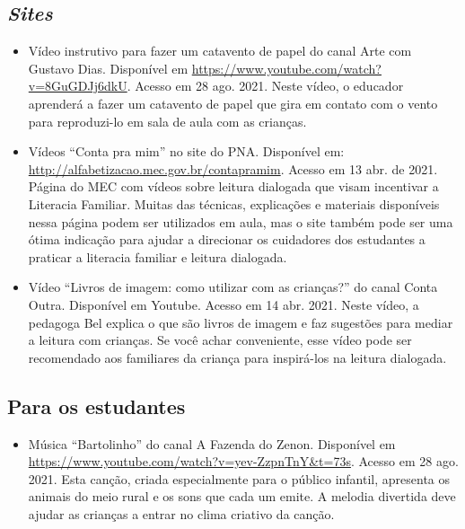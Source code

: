 \documentclass[11pt]{extarticle}
\begin{document}
\subsection{\textit{Sites}}

\begin{itemize}

\item Vídeo instrutivo para fazer um catavento de papel do canal Arte com Gustavo Dias. Disponível em \url{https://www.youtube.com/watch?v=8GuGDJj6dkU}.
	Acesso em 28 ago. 2021.
	Neste vídeo, o educador aprenderá a fazer um catavento de papel que gira em contato com o vento para
	reproduzi-lo em sala de aula com as crianças.

\item Vídeos “Conta pra mim” no site do PNA. Disponível em: \url{http://alfabetizacao.mec.gov.br/contapramim}. 
Acesso em 13 abr. de 2021.
Página do MEC com vídeos sobre leitura dialogada que visam incentivar a Literacia Familiar. Muitas das 
técnicas, explicações e materiais disponíveis nessa página podem ser utilizados em aula, mas o site também 
pode ser uma ótima indicação para ajudar a direcionar os cuidadores dos estudantes a praticar 
a literacia familiar e leitura dialogada.

\item Vídeo “Livros de imagem: como utilizar com as crianças?” do canal Conta Outra. Disponível em Youtube. 
Acesso em 14 abr. 2021. 
Neste vídeo, a pedagoga Bel explica o que são livros de imagem e faz sugestões para mediar a leitura com 
crianças. Se você achar conveniente, esse vídeo pode ser recomendado aos familiares da criança 
para inspirá-los na leitura dialogada. 

\end{itemize}


\subsection{Para os estudantes}
\begin{itemize}
\item Música ``Bartolinho'' do canal A Fazenda do Zenon. Disponível em \url{https://www.youtube.com/watch?v=yev-ZzpnTnY&t=73s}. Acesso em 28 ago. 2021. 
Esta canção, criada especialmente para o público infantil, apresenta os animais do meio rural e os
sons que cada um emite. A melodia divertida deve ajudar as crianças a entrar no clima
criativo da canção. 

\end{itemize}
\end{document}
